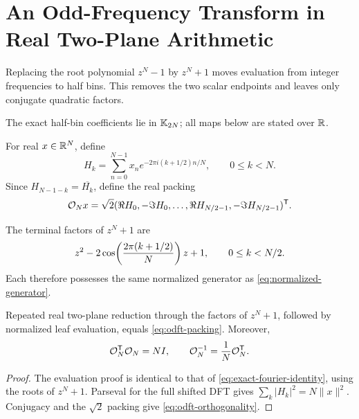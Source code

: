 \section{An Odd-Frequency Transform in Real Two-Plane Arithmetic}
\label{sec:odft}

Replacing the root polynomial $z^N-1$ by $z^N+1$ moves evaluation from integer
frequencies to half bins.  This removes the two scalar endpoints and leaves only
conjugate quadratic factors.

The exact half-bin coefficients lie in $\mathbb{K}_{2N}$; all maps below are stated
over $\mathbb{R}$.

\begin{definition}
For real $x\in\mathbb{R}^N$, define
\begin{equation}
 H_k=\sum_{n=0}^{N-1}x_n
 e^{-2\pi i(k+1/2)n/N},\qquad 0\le k<N.
 \label{eq:odft-definition}
\end{equation}
Since $H_{N-1-k}=\overline{H_k}$, define the real packing
\begin{equation}
 \mathcal{O}_Nx=\sqrt2(\Re H_0,-\Im H_0,\ldots,
 \Re H_{N/2-1},-\Im H_{N/2-1})^{\mathsf{T}}.
 \label{eq:odft-packing}
\end{equation}
\end{definition}

The terminal factors of $z^N+1$ are
\begin{equation}
 z^2-2\cos\!\left({2\pi(k+1/2)\over N}\right)z+1,
 \qquad 0\le k<N/2.
 \label{eq:odft-factors}
\end{equation}
Each therefore possesses the same normalized generator as
\eqref{eq:normalized-generator}.

\begin{theorem}
Repeated real two-plane reduction through the factors of $z^N+1$, followed by
normalized leaf evaluation, equals \eqref{eq:odft-packing}.  Moreover,
\begin{equation}
 \mathcal{O}_N^{\mathsf{T}}\mathcal{O}_N=NI,
 \qquad
 \mathcal{O}_N^{-1}={1\over N}\mathcal{O}_N^{\mathsf{T}}.
 \label{eq:odft-orthogonality}
\end{equation}
\end{theorem}
\begin{proof}
The evaluation proof is identical to that of
\eqref{eq:exact-fourier-identity}, using the roots of $z^N+1$.  Parseval for the
full shifted DFT gives $\sum_k|H_k|^2=N\|x\|^2$.  Conjugacy and the $\sqrt2$
packing give \eqref{eq:odft-orthogonality}.
\end{proof}

